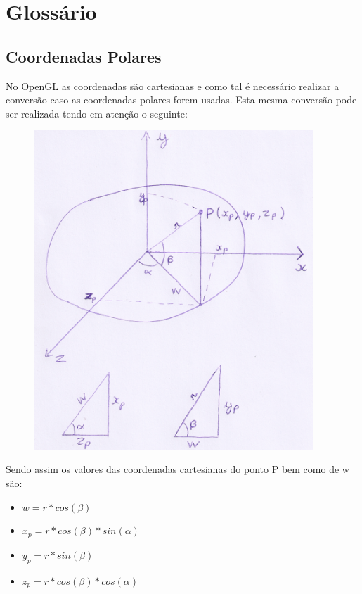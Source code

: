 \documentclass{article}
\begin{document}
\section{Glossário}

\subsection{Coordenadas Polares}
No OpenGL as coordenadas são cartesianas e como tal é necessário realizar a conversão caso as coordenadas polares forem usadas. Esta mesma conversão pode ser realizada tendo em atenção o seguinte:

\begin{figure}[ht!]
\centering
\includegraphics[height=12cm]{scan.png}
\end{figure}
Sendo assim os valores das coordenadas cartesianas do ponto P bem como de w são:
\begin{itemize}
    \item $w = r * cos(\beta)$
    \item $x_{p} = r * cos(\beta) * sin(\alpha)$
    \item $y_{p} = r * sin(\beta)$
    \item $z_{p} = r * cos(\beta) * cos(\alpha)$
\end{itemize}
\end{document}
